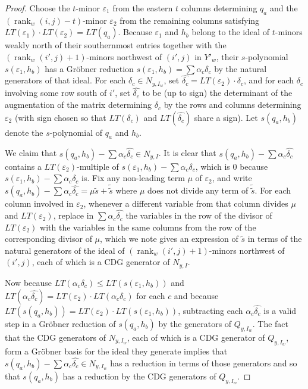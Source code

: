 \documentclass[ALCO,Unicode,published]{cedram}
\DeclareMathOperator{\rank}{rank}
\begin{document}
\begin{proof}
Choose the $t$-minor $\varepsilon_1$ from the eastern $t$ columns determining $q_a$ and the $(\rank_w(i,j)-t)$-minor $\varepsilon_2$ from the remaining columns satisfying $LT(\varepsilon_1) \cdot LT(\varepsilon_2) = LT(q_a)$.  Because $\varepsilon_1$ and $h_b$ belong to the ideal of $t$-minors weakly north of their southernmost entries together with the $(\rank_w(i',j)+1)$-minors northwest of $(i',j)$ in $Y'_w$, their $s$-polynomial $s(\varepsilon_1,h_b)$ has a Gr\"obner reduction $s(\varepsilon_1,h_b) = \sum \alpha_c \delta_c $ by the natural generators of that ideal.  For each $\delta_c \in N_{y,I_w}$, set $\widehat{\delta_c} = LT(\varepsilon_2) \cdot \delta_c$, and for each $\delta_c$ involving some row south of $i'$, set $\widehat{\delta_c}$ to be (up to sign) the determinant of the augmentation of the matrix determining $\delta_c$ by the rows and columns determining $\varepsilon_2$ (with sign chosen so that $LT(\delta_c)$ and $LT(\widehat{\delta_c})$ share a sign).  Let $s(q_a,h_b)$ denote the $s$-polynomial of $q_a$ and $h_b$.  

We claim that $s(q_a,h_b)-\sum \alpha_c \widehat{\delta_c} \in N_{y,I}$.  It is clear that $s(q_a,h_b)-\sum \alpha_c \widehat{\delta_c}$ contains a $LT(\varepsilon_2)$-multiple of $s(\varepsilon_1,h_b)-\sum \alpha_c \delta_c$, which is $0$ because $s(\varepsilon_1,h_b)-\sum \alpha_c \delta_c$ is.  Fix any non-leading term $\mu$ of $\varepsilon_2$, and write $s(q_a,h_b)-\sum \alpha_c \widehat{\delta_c} = \mu \tilde{s}+\tilde{\tilde{s}}$ where $\mu$ does not divide any term of $\tilde{\tilde{s}}$.  For each column involved in $\varepsilon_2$, whenever a different variable from that column divides $\mu$ and $LT(\varepsilon_2)$, replace in $\sum \alpha_c \widehat{\delta_c}$ the variables in the row of the divisor of $LT(\varepsilon_2)$ with the variables in the same columns from the row of the corresponding divisor of $\mu$, which we note gives an expression of $\tilde{s}$ in terms of the natural generators of the ideal of $(\rank_w(i',j)+1)$-minors northwest of $(i',j)$, each of which is a CDG generator of $N_{y,I}$.

Now because $LT(\alpha_c\delta_c) \leq LT(s(\varepsilon_1,h_b))$ and $LT(\alpha_c \widehat{\delta_c}) = LT(\varepsilon_2) \cdot LT(\alpha_c\delta_c)$ for each $c$ and because $LT(s(q_a,h_b)) = LT(\varepsilon_2) \cdot LT(s(\varepsilon_1,h_b))$, subtracting each $\alpha_c \widehat{\delta_c}$ is a valid step in a Gr\"obner reduction of $s(q_a,h_b)$ by the generators of $Q_{y,I_w}$.  The fact that the CDG generators of $N_{y,I_w}$, each of which is a CDG generator of $Q_{y,I_w}$, form a Gr\"obner basis for the ideal they generate implies that $s(q_a,h_b)-\sum \alpha_c \widehat{\delta_c} \in N_{y,I_w}$ has a reduction in terms of those generators and so that $s(q_a,h_b)$ has a reduction by the CDG generators of $Q_{y,I_w}$.


\end{proof}
\end{document}
